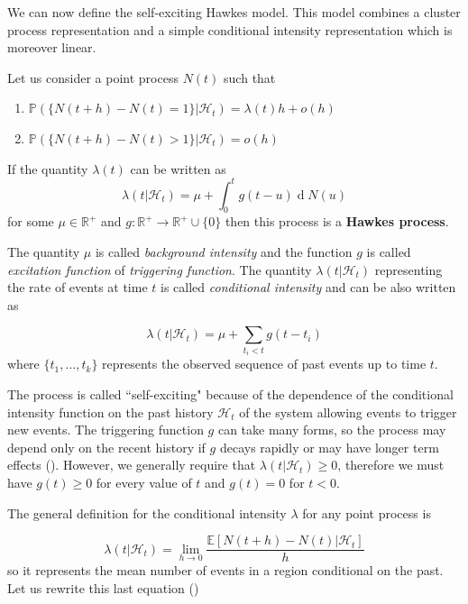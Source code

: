 \documentclass[11pt,a4paper]{article}
\renewcommand{\d}[1]{\ensuremath{\operatorname{d}\!{#1}}}
\begin{document}
We can now define the self-exciting Hawkes model. This model combines a cluster process representation and a simple conditional intensity representation which is moreover linear.

\begin{definition}\label{def:Hawkes}
    Let us consider a point process $N(t)$ such that
    \begin{enumerate}[label=(\roman*)]
        \item $\mathbb{P}(\{ N(t+h) - N(t) = 1 \} | \mathcal{H}_t) = \lambda(t)h + o(h)$
        \item $\mathbb{P}(\{ N(t+h) - N(t) > 1 \} | \mathcal{H}_t) = o(h)$
    \end{enumerate}
    If the quantity $\lambda(t)$ can be written as
    \begin{equation*}
        \lambda(t | \mathcal{H}_t) = \mu + \int_{0}^t g(t - u) \d N(u)
    \end{equation*}
    for some $\mu \in \mathbb{R^+}$ and $g : \mathbb{R^+} \rightarrow \mathbb{R^+} \cup \{0\}$ then this process is a \textbf{Hawkes process}.
\end{definition}
The quantity $\mu$ is called \textit{background intensity} and the function $g$ is called \textit{excitation function} of \textit{triggering function}. The quantity $\lambda(t | \mathcal{H}_t)$ representing the rate of events at time $t$ is called \textit{conditional intensity} and can be also written as

\begin{equation*}
    \lambda(t|\mathcal{H}_t) = \mu + \sum_{t_i < t} g(t - t_i)
\end{equation*}
where $\{ t_1, \dots, t_k\}$ represents the observed sequence of past events up to time $t$.

The process is called ``self-exciting" because of the dependence of the conditional intensity function on the past history $\mathcal{H}_t$ of the system allowing events to trigger new events. The triggering function $g$ can take many forms, so the process may depend only on the recent history if $g$ decays rapidly or may have longer term effects (\cite{Reinhart}). However, we generally require that $\lambda(t | \mathcal{H}_t)  \geq 0$, therefore we must have $g(t) \geq 0$ for every value of $t$ and $g(t) = 0$ for $t < 0$.

The general definition for the conditional intensity $\lambda$ for any point process is

\begin{equation*}
    \lambda(t | \mathcal{H}_t) = \lim_{h \to 0} \frac{\mathbb{E}[N(t+h) - N(t) | \mathcal{H}_t]}{h}
\end{equation*}
so it represents the mean number of events in a region conditional on the past.
Let us rewrite this last equation (\cite{Rasmussen})
\end{document}
